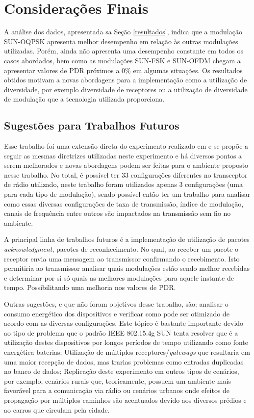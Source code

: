 \chapter{Considerações Finais}
\label{cap:conclusao}
A análise dos dados, apresentada sa Seção \ref{resultados}, indica que a modulação SUN-OQPSK apresenta melhor desempenho em relação às outras modulações utilizadas. Porém, ainda não apresenta uma desempenho constante em todos os casos abordados, bem como as modulações SUN-FSK e SUN-OFDM chegam a apresentar valores de PDR próximos a 0\% em algumas situações. Os resultados obtidos motivam a novas abordagens para a implementação como a utilização de diversidade, por exemplo diversidade de receptores ou a utilização de diversidade de modulação que a tecnologia utilizada proporciona.

\section{Sugestões para Trabalhos Futuros}
\label{sec:futuros}
Esse trabalho foi uma extensão direta do experimento realizado em \cite{tuset2020dataset} e se propõe a seguir as mesmas diretrizes utilizadas neste experimento e há diversos pontos a serem melhorados e novas abordagens podem ser feitas para o ambiente proposto nesse trabalho. No total, é possível ter 33 configurações diferentes no transceptor de rádio utilizado, neste trabalho foram utilizados apenas 3 configurações (uma para cada tipo de modulação), sendo possível então ter um trabalho para analisar como essas diversas configurações de taxa de transmissão, índice de modulação, canais de frequência entre outros são impactados na transmissão sem fio no ambiente.

A principal linha de trabalhos futuros é a implementação de utilização de pacotes \emph{acknowledgment}, pacotes de reconhecimento. No qual, ao receber um pacote o receptor envia uma mensagem ao transmissor confirmando o recebimento. Isto permitiria ao transmissor analisar quais modulações estão sendo melhor recebidas e determinar por si só quais as melhores modulações para aquele instante de tempo. Possibilitando uma melhoria nos valores de PDR.

Outras sugestões, e que não foram objetivos desse trabalho, são: analisar o consumo energético dos dispositivos e verificar como pode ser otimizado de acordo com as diversas configurações. Este tópico é bastante importante devido ao tipo de problema que o padrão IEEE 802.15.4g SUN tenta resolver que é a utilização destes dispositivos por longos períodos de tempo utilizando como fonte energética baterias; Utilização de múltiplos receptores/\emph{gateways} que resultaria em uma maior recepção de dados, mas trarias problemas como entradas duplicadas no banco de dados; Replicação deste experimento em outros tipos de cenários, por exemplo, cenários rurais que, teoricamente, possuem um ambiente mais favorável para a comunicação via rádio ou cenários urbanos onde efeitos de propagação por múltiplos caminhos são acentuados devido aos diversos prédios e ao carros que circulam pela cidade.